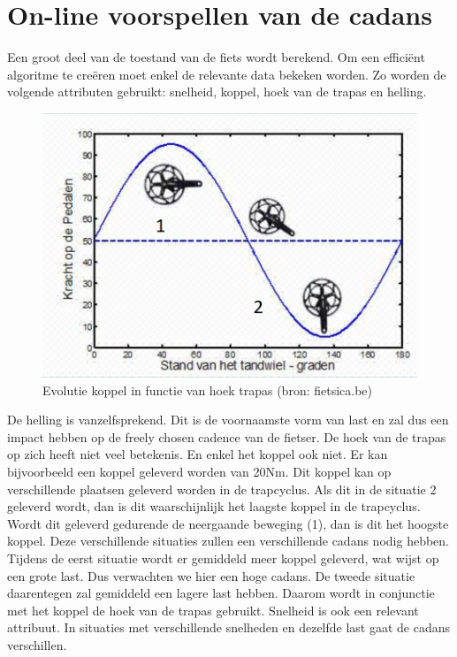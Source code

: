 \section{On-line voorspellen van de cadans}
Een groot deel van de toestand van de fiets wordt berekend. Om een efficiënt algoritme te creëren moet enkel de relevante data bekeken worden. Zo worden de volgende attributen gebruikt: snelheid, koppel, hoek van de trapas en helling. 
\\

\begin{figure}
  \centering
  \includegraphics[width=\linewidth]{images/trapcyclus.png}
  \caption{Evolutie koppel in functie van hoek trapas (bron: fietsica.be)}
  \label{fig:Evolutie koppel in functie van hoek trapas}
\end{figure}
\noindent De helling is vanzelfsprekend. Dit is de voornaamste vorm van last en zal dus een impact hebben op de freely chosen cadence van de fietser. De hoek van de trapas op zich heeft niet veel betekenis. En enkel het koppel ook niet. Er kan bijvoorbeeld een koppel geleverd worden van 20Nm. Dit koppel kan op verschillende plaatsen geleverd worden in de trapcyclus. Als dit in de situatie 2 geleverd wordt, dan is dit waarschijnlijk het laagste koppel in de trapcyclus. Wordt dit geleverd gedurende de neergaande beweging (1), dan is dit het hoogste koppel. Deze verschillende situaties zullen een verschillende cadans nodig hebben. Tijdens de eerst situatie wordt er gemiddeld meer koppel geleverd, wat wijst op een grote last. Dus verwachten we hier een hoge cadans. De tweede situatie daarentegen zal gemiddeld een lagere last hebben. Daarom wordt in conjunctie met het koppel de hoek van de trapas gebruikt. Snelheid is ook een relevant attribuut. In situaties met verschillende snelheden en dezelfde last gaat de cadans verschillen.
\newpage
